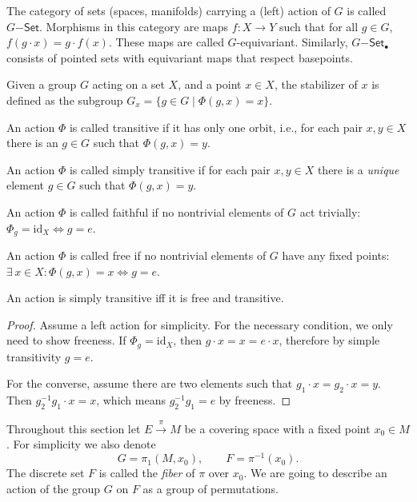 \begin{defn}
    The category of sets (spaces, manifolds) carrying a (left) action of $G$ is called $G\mathsf{-Set}$. Morphisms in this category are maps $f:X\to Y$ such that for all $g\in G$, $f(g\cdot x)=g\cdot f(x)$. These maps are called $G$-equivariant. Similarly, $G\mathsf{-Set}_\bullet$ consists of pointed sets with equivariant maps that respect basepoints. 
\end{defn}
\begin{defn}[Stabilizer]
    Given a group $G$ acting on a set $X$, and a point $x\in X$, the stabilizer of $x$ is defined as the subgroup $G_x=\{g\in G\mid \Phi(g,x)=x\}$.
\end{defn}
\begin{defn}
    An action $\Phi$ is called transitive if it has only one orbit, i.e., for each pair $x,y\in X$ there is an $g\in G$ such that $\Phi(g,x)=y$.
\end{defn}
\begin{defn}
    An action $\Phi$ is called simply transitive if for each pair $x,y\in X$ there is a \emph{unique} element $g\in G$ such that $\Phi(g,x)=y$.
\end{defn}
\begin{defn}
    An action $\Phi$ is called faithful if no nontrivial elements of $G$ act trivially: $\Phi_g=\mathrm{id}_X \Leftrightarrow g=e$.
\end{defn}
\begin{defn}
    An action $\Phi$ is called free if no nontrivial elements of $G$ have any fixed points: $\exists\,x\in X: \Phi(g,x)=x\Leftrightarrow g=e$. 
\end{defn}
\begin{prop}
    An action is simply transitive iff it is free and transitive.
\end{prop}
\begin{proof}
    Assume a left action for simplicity. For the necessary condition, we only need to show freeness. If $\Phi_g=\mathrm{id}_X$, then $g\cdot x=x=e\cdot x$, therefore by simple transitivity $g=e$.

    For the converse, assume there are two elements such that $g_1\cdot x=g_2\cdot x=y$. Then $g_2^{-1}g_1\cdot x=x$, which means $g_2^{-1}g_1=e$ by freeness.
\end{proof}

Throughout this section let $E\overset{\pi}{\to}M$ be a covering space with a fixed point $x_0\in M$. For simplicity we also denote
\[G=\pi_1(M,x_0),\quad \quad F=\pi^{-1}(x_0).\]
The discrete set $F$ is called the \emph{fiber} of $\pi$ over $x_0$. We are going to describe an action of the group $G$ on $F$ as a group of permutations. 

